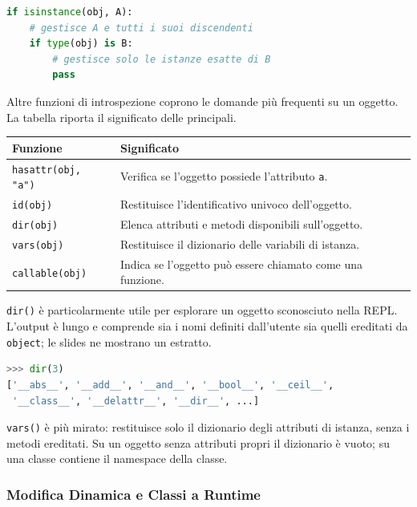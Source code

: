 \documentclass[12pt]{extarticle}
\begin{document}
\begin{lstlisting}[language=Python]
if isinstance(obj, A):
    # gestisce A e tutti i suoi discendenti
    if type(obj) is B:
        # gestisce solo le istanze esatte di B
        pass
\end{lstlisting}

\noindent Altre funzioni di introspezione coprono le domande più frequenti su un oggetto. La tabella riporta il significato delle principali.

\begin{center}
\small
\begin{tabular}{p{4.2cm}p{8.0cm}}
    \toprule
    \textbf{Funzione} & \textbf{Significato} \\
    \midrule
    \texttt{hasattr(obj, "a")} & Verifica se l'oggetto possiede l'attributo \texttt{a}. \\
    \addlinespace
    \texttt{id(obj)} & Restituisce l'identificativo univoco dell'oggetto. \\
    \addlinespace
    \texttt{dir(obj)} & Elenca attributi e metodi disponibili sull'oggetto. \\
    \addlinespace
    \texttt{vars(obj)} & Restituisce il dizionario delle variabili di istanza. \\
    \addlinespace
    \texttt{callable(obj)} & Indica se l'oggetto può essere chiamato come una funzione. \\
    \bottomrule
\end{tabular}
\end{center}

\noindent \texttt{dir()} è particolarmente utile per esplorare un oggetto sconosciuto nella REPL. L'output è lungo e comprende sia i nomi definiti dall'utente sia quelli ereditati da \texttt{object}; le slides ne mostrano un estratto.

\begin{lstlisting}[language=Python]
>>> dir(3)
['__abs__', '__add__', '__and__', '__bool__', '__ceil__',
 '__class__', '__delattr__', '__dir__', ...]
\end{lstlisting}

\noindent \texttt{vars()} è più mirato: restituisce solo il dizionario degli attributi di istanza, senza i metodi ereditati. Su un oggetto senza attributi propri il dizionario è vuoto; su una classe contiene il namespace della classe.

\subsubsection{Modifica Dinamica e Classi a Runtime}
\end{document}
